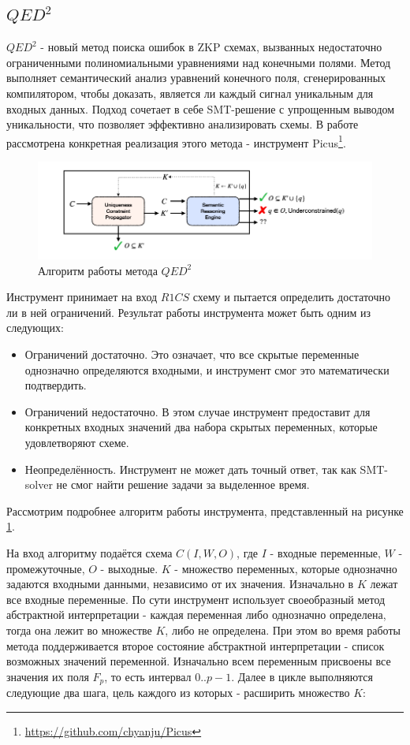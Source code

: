 \documentclass[a4paper]{article}
\begin{document}
\subsection{$QED^2$}
\indent

$QED^2$\cite{litlink7} - новый метод поиска ошибок в ZKP схемах, вызванных недостаточно ограниченными полиномиальными уравнениями над конечными полями. Метод выполняет семантический анализ уравнений конечного поля, сгенерированных компилятором, чтобы доказать, является ли каждый сигнал уникальным для входных данных. Подход сочетает в себе SMT-решение с упрощенным выводом уникальности, что позволяет эффективно
анализировать схемы. В работе рассмотрена конкретная реализация этого метода - инструмент Picus\footnote[1]{\href{https://github.com/chyanju/Picus}{https://github.com/chyanju/Picus}}.

\begin{figure}[ht!]
\includegraphics[width=180mm]{QED_algo.png}
\caption{Алгоритм работы метода $QED^2$}
\label{QED_algo}
\end{figure}

Инструмент принимает на вход $R1CS$ схему и пытается определить достаточно ли в ней ограничений. Результат работы инструмента может быть одним из следующих:

\begin{itemize}
    \item Ограничений достаточно. Это означает, что все скрытые переменные однозначно определяются входными, и инструмент смог это математически подтвердить.
    \item Ограничений недостаточно. В этом случае инструмент предоставит для конкретных входных значений два набора скрытых переменных, которые удовлетворяют схеме.
    \item Неопределённость. Инструмент не может дать точный ответ, так как SMT-solver не смог найти решение задачи за выделенное время.
\end{itemize}

Рассмотрим подробнее алгоритм работы инструмента, представленный на рисунке \ref{QED_algo}.

На вход алгоритму подаётся схема $C(I,W,O)$, где $I$ - входные переменные, $W$ - промежуточные, $O$ - выходные. $K$ - множество переменных, которые однозначно задаются входными данными, независимо от их значения. Изначально в $K$ лежат все входные переменные. По сути инструмент использует своеобразный метод абстрактной интерпретации - каждая переменная либо однозначно определена, тогда она лежит во множестве $K$, либо не определена. При этом во время работы метода поддерживается второе состояние абстрактной интерпретации - список возможных значений переменной. Изначально всем переменным присвоены все значения их поля $F_p$, то есть интервал $0..p-1$. Далее в цикле выполняются следующие два шага, цель каждого из которых - расширить множество $K$:
\end{document}
